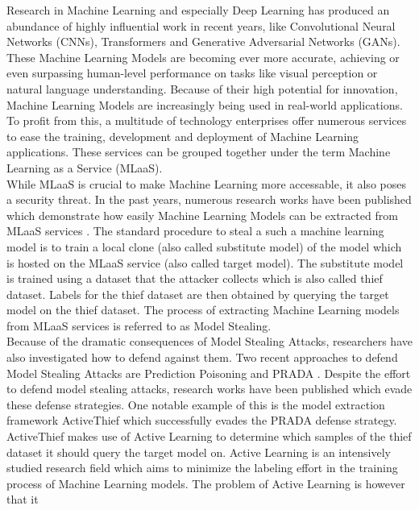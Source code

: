 Research in Machine Learning and especially Deep Learning has produced an abundance of highly influential work in recent years, like
Convolutional Neural Networks (CNNs), Transformers and Generative Adversarial Networks (GANs). These Machine Learning Models are
becoming ever more accurate, achieving or even surpassing human-level performance on tasks like visual perception or natural language
understanding. Because of their high potential for innovation, Machine Learning Models are increasingly being used in real-world 
applications. To profit from this, a multitude of technology enterprises offer numerous services to ease the training, development and
deployment of Machine Learning applications. These services can be grouped together under the term Machine Learning as a Service (MLaaS). \\
While MLaaS is crucial to make Machine Learning more accessable, it also poses a security threat. In the past years, numerous research works
have been published which demonstrate how easily Machine Learning Models can be extracted from MLaaS services \cite{tramer2016stealing}
\cite{reith2019efficiently} \cite{papernot2017practical}. The standard procedure to steal a such a machine learning model is to train a local
clone (also called substitute model) of the model which is hosted on the MLaaS service (also called target model). The substitute model is trained
using a dataset that the attacker collects which is also called thief dataset. Labels for the thief dataset are then obtained by querying the target
model on the thief dataset. The process of extracting Machine Learning models from MLaaS services is referred to as Model Stealing. \\
Because of the dramatic consequences of Model Stealing Attacks, researchers have also investigated how to defend against them. Two recent approaches
to defend Model Stealing Attacks are Prediction Poisoning \cite{orekondy2019prediction} and PRADA \cite{juuti2019prada}. Despite the effort to
defend model stealing attacks, research works have been published which evade these defense strategies. One notable example of this is the model
extraction framework ActiveThief \cite{pal2020activethief} which successfully evades the PRADA defense strategy. ActiveThief makes use of Active
Learning to determine which samples of the thief dataset it should query the target model on. Active Learning is an intensively studied research
field which aims to minimize the labeling effort in the training process of Machine Learning models. The problem of Active Learning is however that it

